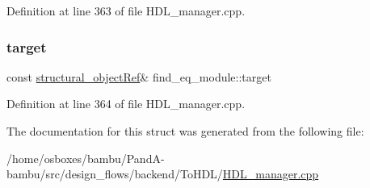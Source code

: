 Definition at line 363 of file H\+D\+L\+\_\+manager.\+cpp.

\mbox{\label{structfind__eq__module_af6445db0606a68f4b32cae24304dbad9}} 
\subsubsection{\texorpdfstring{target}{target}}
{\footnotesize\ttfamily const \hyperlink{structural__objects_8hpp_a8ea5f8cc50ab8f4c31e2751074ff60b2}{structural\+\_\+object\+Ref}\& find\+\_\+eq\+\_\+module\+::target\hspace{0.3cm}{\ttfamily [private]}}



Definition at line 364 of file H\+D\+L\+\_\+manager.\+cpp.



The documentation for this struct was generated from the following file\+:\begin{DoxyCompactItemize}
\item 
/home/osboxes/bambu/\+Pand\+A-\/bambu/src/design\+\_\+flows/backend/\+To\+H\+D\+L/\hyperlink{HDL__manager_8cpp}{H\+D\+L\+\_\+manager.\+cpp}\end{DoxyCompactItemize}
